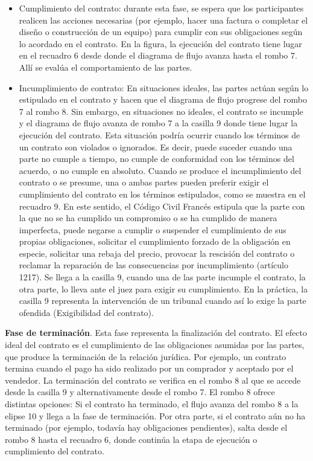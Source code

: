 \documentclass[12pt]{report} %
\begin{document}
\begin{itemize}
\item Cumplimiento del contrato: durante esta fase, se espera que los participantes realicen las acciones necesarias (por ejemplo, hacer una factura o completar el diseño o construcción de un equipo) para cumplir con sus obligaciones según lo acordado en el contrato. En la figura, la ejecución del contrato tiene lugar en el recuadro 6 desde donde el diagrama de flujo avanza hasta el rombo 7. Allí se evalúa el comportamiento de las partes.

\item Incumplimiento de contrato: En situaciones ideales, las partes actúan según lo estipulado en el contrato y hacen que el diagrama de flujo progrese del rombo 7 al rombo 8. Sin embargo, en situaciones no ideales, el contrato se incumple y el diagrama de flujo avanza de rombo 7 a la casilla 9 donde tiene lugar la ejecución del contrato. Esta situación podría ocurrir cuando los términos de un contrato son violados o ignorados. Es decir, puede suceder cuando una parte no cumple a tiempo, no cumple de conformidad con los términos del acuerdo, o no cumple en absoluto. Cuando se produce el incumplimiento del contrato o se presume, una o ambas partes pueden preferir exigir el cumplimiento del contrato en los términos estipulados, como se muestra en el recuadro 9. En este sentido, el Código Civil Francés estipula que la parte con la que no se ha cumplido un compromiso o se ha cumplido de manera imperfecta, puede negarse a cumplir o suspender el cumplimiento de sus propias obligaciones, solicitar el cumplimiento forzado  de la obligación en especie, solicitar una rebaja del precio, provocar la rescisión del contrato o reclamar la reparación de las consecuencias por incumplimiento (artículo 1217). Se llega a la casilla 9, cuando una de las parte incumple el contrato, la otra parte, lo lleva ante el juez para exigir su cumplimiento. En la práctica, la casilla 9 representa la intervención de un tribunal cuando así lo exige la parte ofendida (Exigibilidad del contrato).


\end{itemize}



\textbf{Fase de terminación}. Esta fase representa la finalización del contrato. El efecto ideal del contrato es el cumplimiento de las obligaciones asumidas por las partes, que produce la terminación de la relación jurídica. Por ejemplo, un contrato termina cuando el pago ha sido realizado por un comprador y aceptado por el vendedor. La terminación del contrato se verifica en el rombo 8 al que se accede desde la casilla 9 y alternativamente desde el rombo 7. El rombo 8 ofrece distintas opciones: Si el contrato ha terminado, el flujo avanza del rombo 8 a la elipse 10 y llega a la fase de terminación. Por otra parte, si el contrato aún no ha terminado (por ejemplo, todavía hay obligaciones pendientes), salta desde el rombo 8 hasta el recuadro 6, donde continúa la etapa de ejecución o cumplimiento del contrato.
\end{document}

